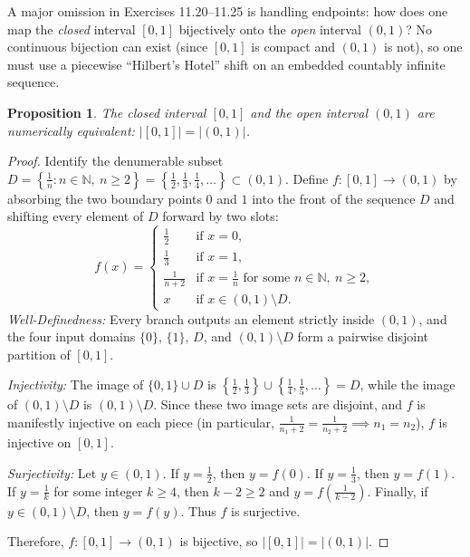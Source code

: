 \documentclass[11pt, letterpaper]{article}
\newtheorem{proposition}[theorem]{Proposition}
\theoremstyle{definition}
\theoremstyle{remark}
\begin{document}
A major omission in Exercises 11.20--11.25 is handling endpoints: how does one map the \emph{closed} interval $[0, 1]$ bijectively onto the \emph{open} interval $(0, 1)$? No continuous bijection can exist (since $[0, 1]$ is compact and $(0, 1)$ is not), so one must use a piecewise ``Hilbert's Hotel'' shift on an embedded countably infinite sequence.

\begin{proposition}
The closed interval $[0, 1]$ and the open interval $(0, 1)$ are numerically equivalent: $|[0, 1]| = |(0, 1)|$.
\end{proposition}

\begin{proof}
Identify the denumerable subset $D = \left\{\frac{1}{n} : n \in \mathbb{N},\ n \ge 2\right\} = \left\{\frac{1}{2}, \frac{1}{3}, \frac{1}{4}, \dots\right\} \subset (0, 1)$. Define $f : [0, 1] \to (0, 1)$ by absorbing the two boundary points $0$ and $1$ into the front of the sequence $D$ and shifting every element of $D$ forward by two slots:
\[
f(x) = \begin{cases}
\displaystyle \frac{1}{2} & \text{if } x = 0, \\[8pt]
\displaystyle \frac{1}{3} & \text{if } x = 1, \\[8pt]
\displaystyle \frac{1}{n + 2} & \text{if } x = \frac{1}{n} \text{ for some } n \in \mathbb{N},\ n \ge 2, \\[8pt]
x & \text{if } x \in (0, 1) \setminus D.
\end{cases}
\]
\emph{Well-Definedness:} Every branch outputs an element strictly inside $(0, 1)$, and the four input domains $\{0\}$, $\{1\}$, $D$, and $(0, 1) \setminus D$ form a pairwise disjoint partition of $[0, 1]$.

\emph{Injectivity:} The image of $\{0, 1\} \cup D$ is $\left\{\frac{1}{2}, \frac{1}{3}\right\} \cup \left\{\frac{1}{4}, \frac{1}{5}, \dots\right\} = D$, while the image of $(0, 1) \setminus D$ is $(0, 1) \setminus D$. Since these two image sets are disjoint, and $f$ is manifestly injective on each piece (in particular, $\frac{1}{n_1 + 2} = \frac{1}{n_2 + 2} \implies n_1 = n_2$), $f$ is injective on $[0, 1]$.

\emph{Surjectivity:} Let $y \in (0, 1)$. If $y = \frac{1}{2}$, then $y = f(0)$. If $y = \frac{1}{3}$, then $y = f(1)$. If $y = \frac{1}{k}$ for some integer $k \ge 4$, then $k - 2 \ge 2$ and $y = f\left(\frac{1}{k - 2}\right)$. Finally, if $y \in (0, 1) \setminus D$, then $y = f(y)$. Thus $f$ is surjective.

Therefore, $f : [0, 1] \to (0, 1)$ is bijective, so $|[0, 1]| = |(0, 1)|$.
\end{proof}
\end{document}
